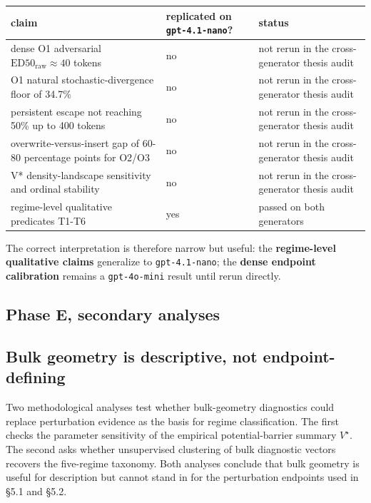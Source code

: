 \documentclass{article}
\theoremstyle{plain}
\theoremstyle{definition}
\begin{document}
\begin{table}[h!]
\centering
\small
\begin{tabularx}{\textwidth}{lYY}
\toprule
claim & replicated on \texttt{gpt-4.1-nano}? & status \\
\midrule
dense O1 adversarial $\mathrm{ED50}_{\mathrm{raw}} \approx 40$ tokens & no & not rerun in the cross-generator thesis audit \\
O1 natural stochastic-divergence floor of 34.7\% & no & not rerun in the cross-generator thesis audit \\
persistent escape not reaching 50\% up to 400 tokens & no & not rerun in the cross-generator thesis audit \\
overwrite-versus-insert gap of 60-80 percentage points for O2/O3 & no & not rerun in the cross-generator thesis audit \\
V* density-landscape sensitivity and ordinal stability & no & not rerun in the cross-generator thesis audit \\
regime-level qualitative predicates T1-T6 & yes & passed on both generators \\
\bottomrule
\end{tabularx}
\end{table}

The correct interpretation is therefore narrow but useful: the \textbf{regime-level qualitative claims} generalize to \texttt{gpt-4.1-nano}; the \textbf{dense endpoint calibration} remains a \texttt{gpt-4o-mini} result until rerun directly.


\subsection*{Phase E, secondary analyses}

\subsection{Bulk geometry is descriptive, not endpoint-defining}

Two methodological analyses test whether bulk-geometry diagnostics could replace perturbation evidence as the basis for regime classification. The first checks the parameter sensitivity of the empirical potential-barrier summary $V^\star$. The second asks whether unsupervised clustering of bulk diagnostic vectors recovers the five-regime taxonomy. Both analyses conclude that bulk geometry is useful for description but cannot stand in for the perturbation endpoints used in §5.1 and §5.2.
\end{document}
